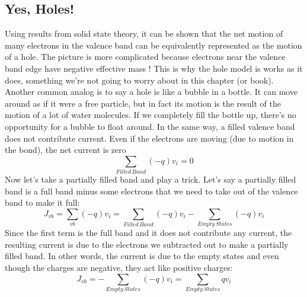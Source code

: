 \subsection{Yes, Holes!}
Using results from solid state theory, it can be shown that the net motion of many electrons in the valence band can be equivalently represented as the motion of a hole.  The picture is more complicated because electrons near the valence band edge have negative effective mass !  This is why the hole model is works as it does, something we’re not going to worry about in this chapter (or book).  Another common analog is to say a hole is like a bubble in a bottle. It can move around as if it were a free particle, but in fact its motion is the result of the motion of a lot of water molecules.  If we completely fill the bottle up, there’s no opportunity for a bubble to float around.  In the same way, a filled valence band does not contribute current.  Even if the electrons are moving (due to motion in the bond), the net current is zero
\begin{equation}
	\sum\limits_{Filled\,Band} {( - q){v_i}} = 0
\end{equation}
Now let’s take a partially filled band and play a trick.  Let’s say a partially filled band is a full band minus some electrons that we need to take out of the valence band to make it full: 
\begin{equation}
{J_{vb}} = \sum\limits_{vb} {( - q){v_i}}  = \sum\limits_{Filled\,Band} {( - q){v_i} - \sum\limits_{Empty\,States} {( - q){v_i}} }
\end{equation}
Since the first term is the full band and it does not contribute any current, the resulting current is due to the electrons we subtracted out to make a partially filled band.  In other words, the current is due to the empty states and even though the charges are negative, they act like positive charges:
\begin{equation}
{J_{vb}} =  - \sum\limits_{Empty\,States} {( - q){v_i}}  = \sum\limits_{Empty\,States} {q{v_i}}
\end{equation}
